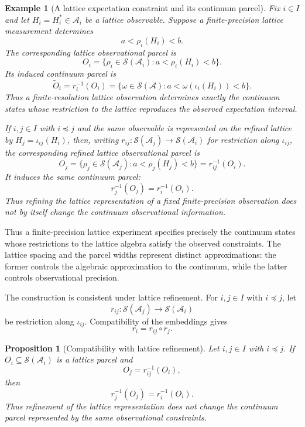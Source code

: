 \documentclass[11pt]{article}
\newtheorem{example}[theorem]{Example}
\newtheorem{proposition}[theorem]{Proposition}
\begin{document}
\begin{example}[A lattice expectation constraint and its continuum parcel]
\label{ex:latticeparcel}
Fix $i\in I$ and let $H_i=H_i^*\in\mathcal A_i$ be a lattice observable.
Suppose a finite-precision lattice measurement determines
\[
a<\rho_i(H_i)<b.
\]
The corresponding lattice observational parcel is
\[
O_i
=
\{\rho_i\in\mathcal S(\mathcal A_i):
a<\rho_i(H_i)<b\}.
\]
Its induced continuum parcel is
\[
\widetilde O_i
=
r_i^{-1}(O_i)
=
\{\omega\in\mathcal S(\mathcal A):
a<\omega(\iota_i(H_i))<b\}.
\]
Thus a finite-resolution lattice observation determines exactly the
continuum states whose restriction to the lattice reproduces the observed
expectation interval.

If $i,j\in I$ with $i\preceq j$ and the same observable is represented
on the refined lattice by $H_j=\iota_{ij}(H_i)$, then, writing
$r_{ij}:\mathcal S(\mathcal A_j)\to\mathcal S(\mathcal A_i)$ for
restriction along $\iota_{ij}$, the corresponding refined lattice observational parcel is
\[
O_j
=
\{\rho_j\in\mathcal S(\mathcal A_j):
a<\rho_j(H_j)<b\}
=
r_{ij}^{-1}(O_i).
\]
It induces the same continuum parcel:
\[
r_j^{-1}(O_j)=r_i^{-1}(O_i).
\]
Thus refining the lattice representation of a fixed finite-precision
observation does not by itself change the continuum observational
information.
\end{example}

Thus a finite-precision lattice experiment specifies precisely the
continuum states whose restrictions to the lattice algebra satisfy the
observed constraints. The lattice spacing and the parcel widths represent
distinct approximations: the former controls the algebraic approximation
to the continuum, while the latter controls observational precision.

The construction is consistent under lattice refinement. For
$i,j\in I$ with $i\preceq j$, let
\[
r_{ij}:\mathcal S(\mathcal A_j)\longrightarrow
\mathcal S(\mathcal A_i)
\]
be restriction along $\iota_{ij}$. Compatibility of the embeddings gives
\[
r_i=r_{ij}\circ r_j.
\]

\begin{proposition}[Compatibility with lattice refinement]
\label{thm:latticecompatibility}
Let $i,j\in I$ with $i\preceq j$. If
$O_i\subseteq\mathcal S(\mathcal A_i)$ is a lattice parcel and
\[
O_j=r_{ij}^{-1}(O_i),
\]
then
\[
r_j^{-1}(O_j)=r_i^{-1}(O_i).
\]
Thus refinement of the lattice representation does not change the
continuum parcel represented by the same observational constraints.
\end{proposition}
\end{document}
